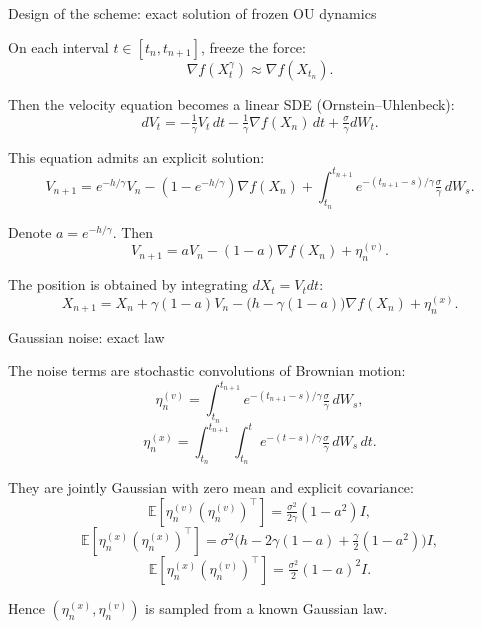 \documentclass{beamer}
\newcommand{\<}{\langle}
\renewcommand{\>}{\rangle}
\begin{document}
\begin{frame}{Design of the scheme: exact solution of frozen OU dynamics}

    On each interval $t\in[t_n, t_{n+1}]$, freeze the force:
    \[
    \nabla f(X_t^\gamma)\approx \nabla f(X_{t_n}).
    \]

    Then the velocity equation becomes a linear SDE (Ornstein--Uhlenbeck):
    \[
    dV_t = -\tfrac{1}{\gamma}V_t\,dt - \tfrac{1}{\gamma}\nabla f(X_n)\,dt + \tfrac{\sigma}{\gamma}dW_t.
    \]

    This equation admits an explicit solution:
    \[
    V_{n+1} = e^{-h/\gamma}V_n - (1-e^{-h/\gamma})\nabla f(X_n)
    + \int_{t_n}^{t_{n+1}} e^{-(t_{n+1}-s)/\gamma}\tfrac{\sigma}{\gamma}\,dW_s.
    \]

    Denote $a=e^{-h/\gamma}$. Then
    \[
    \boxed{
    V_{n+1}=aV_n-(1-a)\nabla f(X_n)+\eta_n^{(v)}.
    }
    \]

    The position is obtained by integrating $dX_t = V_t dt$:
    \[
    \boxed{
    X_{n+1}=X_n+\gamma(1-a)V_n-\bigl(h-\gamma(1-a)\bigr)\nabla f(X_n)+\eta_n^{(x)}.
    }
    \]

\end{frame}

\begin{frame}{Gaussian noise: exact law}

    The noise terms are stochastic convolutions of Brownian motion:
    \[
    \eta_n^{(v)}=\int_{t_n}^{t_{n+1}} e^{-(t_{n+1}-s)/\gamma}\tfrac{\sigma}{\gamma}\,dW_s,
    \]
    \[
    \eta_n^{(x)}=\int_{t_n}^{t_{n+1}}\int_{t_n}^{t} e^{-(t-s)/\gamma}\tfrac{\sigma}{\gamma}\,dW_s\,dt.
    \]

    They are jointly Gaussian with zero mean and explicit covariance:
    \[
    \mathbb E[\eta_n^{(v)}(\eta_n^{(v)})^\top]
    = \tfrac{\sigma^2}{2\gamma}(1-a^2)I,
    \]
    \[
    \mathbb E[\eta_n^{(x)}(\eta_n^{(x)})^\top]
    = \sigma^2\Big(h - 2\gamma(1-a) + \tfrac{\gamma}{2}(1-a^2)\Big)I,
    \]
    \[
    \mathbb E[\eta_n^{(x)}(\eta_n^{(v)})^\top]
    = \tfrac{\sigma^2}{2}(1-a)^2 I.
    \]

    Hence $(\eta_n^{(x)},\eta_n^{(v)})$ is sampled from a known Gaussian law.

\end{frame}
\end{document}
